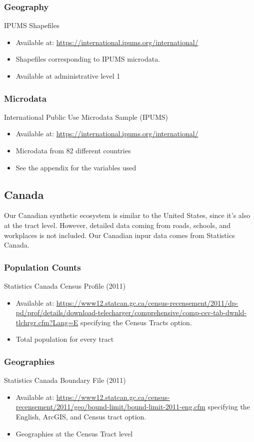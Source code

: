 \documentclass{article}
\begin{document}
		\subsubsection{Geography}
		IPUMS Shapefiles 
		\begin{itemize}
			\item Available at: \url{https://international.ipums.org/international/}
			\item Shapefiles corresponding to IPUMS microdata. 
			\item Available at administrative level 1 
		\end{itemize}

		\subsubsection{Microdata}	
		International Public Use Microdata Sample (IPUMS)
		\begin{itemize}			
			\item Available at: \url{https://international.ipums.org/international/}
			\item Microdata from 82 different countries 
			\item See the appendix for the variables used 
		\end{itemize}


	\subsection{Canada}	

		Our Canadian synthetic ecosystem is similar to the United States, since it's also at the tract level. However, detailed data coming from roads, schools, and workplaces is not included. Our Canadian inpur data comes from Statistics Canada.

		\subsubsection{Population Counts}
		Statistics Canada Census Profile (2011)
		\begin{itemize}
			\item Available at: \url{https://www12.statcan.gc.ca/census-recensement/2011/dp-pd/prof/details/download-telecharger/comprehensive/comp-csv-tab-dwnld-tlchrgr.cfm?Lang=E} specifying the Census Tracts option.
			\item Total population for every tract 
		\end{itemize}

		\subsubsection{Geographies}
		Statistics Canada Boundary File (2011)
		\begin{itemize}
			\item Available at: \url{https://www12.statcan.gc.ca/census-recensement/2011/geo/bound-limit/bound-limit-2011-eng.cfm} specifying the English, ArcGIS, and Census tract option.
			\item Geographies at the Census Tract level 
		\end{itemize}
\end{document}
